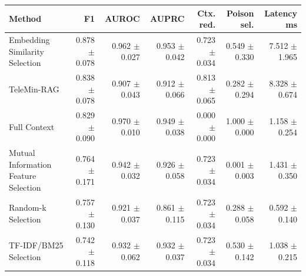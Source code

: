 \begin{tabular}{lrrrrrr}
\toprule
Method & F1 & AUROC & AUPRC & Ctx. red. & Poison sel. & Latency ms \\
\midrule
Embedding Similarity Selection & 0.878 $\pm$ 0.078 & 0.962 $\pm$ 0.027 & 0.953 $\pm$ 0.042 & 0.723 $\pm$ 0.034 & 0.549 $\pm$ 0.330 & 7.512 $\pm$ 1.965 \\
TeleMin-RAG & 0.838 $\pm$ 0.078 & 0.907 $\pm$ 0.043 & 0.912 $\pm$ 0.066 & 0.813 $\pm$ 0.065 & 0.282 $\pm$ 0.294 & 8.328 $\pm$ 0.674 \\
Full Context & 0.829 $\pm$ 0.090 & 0.970 $\pm$ 0.010 & 0.949 $\pm$ 0.038 & 0.000 $\pm$ 0.000 & 1.000 $\pm$ 0.000 & 1.158 $\pm$ 0.254 \\
Mutual Information Feature Selection & 0.764 $\pm$ 0.171 & 0.942 $\pm$ 0.032 & 0.926 $\pm$ 0.058 & 0.723 $\pm$ 0.034 & 0.001 $\pm$ 0.003 & 1.431 $\pm$ 0.350 \\
Random-k Selection & 0.757 $\pm$ 0.130 & 0.921 $\pm$ 0.037 & 0.861 $\pm$ 0.115 & 0.723 $\pm$ 0.034 & 0.288 $\pm$ 0.058 & 0.592 $\pm$ 0.140 \\
TF-IDF/BM25 Selection & 0.742 $\pm$ 0.118 & 0.932 $\pm$ 0.062 & 0.932 $\pm$ 0.037 & 0.723 $\pm$ 0.034 & 0.530 $\pm$ 0.142 & 1.038 $\pm$ 0.215 \\
\bottomrule
\end{tabular}
